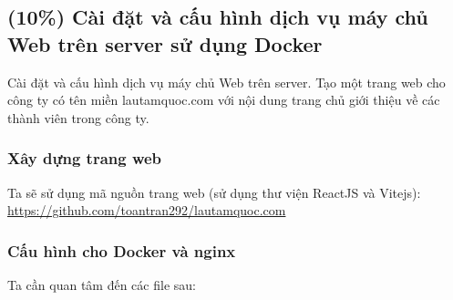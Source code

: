 \subsection{(10\%) Cài đặt và cấu hình dịch vụ máy chủ Web trên server sử dụng Docker}

Cài đặt và cấu hình dịch vụ máy chủ Web trên server. Tạo một trang web
cho công ty có tên miền lautamquoc.com với nội dung trang chủ giới thiệu về các
thành viên trong công ty.

\subsubsection{Xây dựng trang web}

Ta sẽ sử dụng mã nguồn trang web (sử dụng thư viện ReactJS và Vitejs): \url{https://github.com/toantran292/lautamquoc.com}


\subsubsection{Cấu hình cho Docker và nginx}

Ta cần quan tâm đến các file sau:

